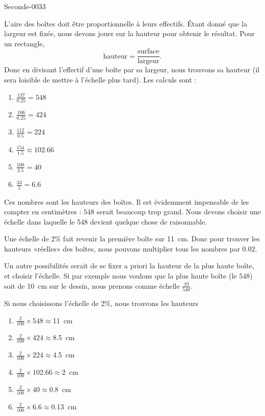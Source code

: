 
\begin{corrige}{Seconde-0033}

    L'aire des boîtes doit être proportionnelle à leurs effectifs. Étant donné que la largeur est fixée, nous devons jouer sur la hauteur pour obtenir le résultat. Pour un rectangle,
    \begin{equation}
        \text{hauteur}=\frac{ \text{surface} }{ \text{largeur} }.
    \end{equation}
    Donc en divisant l'effectif d'une boîte par sa largeur, nous trouvons sa hauteur (il sera loisible de mettre à l'échelle plus tard). Les calculs sont :
    \begin{enumerate}
        \item
            \( \frac{ 137 }{ 0.25 }=548\)
        \item
            \( \frac{ 106 }{ 0.25 }=424\)
        \item
            \( \frac{ 112 }{ 0.5 }=224\)
        \item
            \( \frac{ 154 }{ 1.5 }\approx 102.66\)
        \item
            \( \frac{ 100 }{ 2.5 }=40\)
        \item
            \( \frac{ 33 }{ 5 }=6.6\)
    \end{enumerate}
    Ces nombres sont les hauteurs des boîtes. Il est évidemment impensable de les compter en centimètres : \( 548\) serait beaucoup trop grand. Nous devons choisir une échelle dans laquelle le 548 devient quelque chose de raisonnable.

    Une échelle de \( 2\%\) fait revenir la première boîte sur \SI{11}{\centi\meter}. Donc pour trouver les hauteurs «réelles» des boîtes, nous pouvons multiplier tous les nombres par \( 0.02\).

    Un autre possibilités serait de se fixer a priori la hauteur de la plus haute boîte, et choisir l'échelle. Si par exemple nous voulons que la plus haute boîte (le \( 548\)) soit de \SI{10}{\centi\meter} sur le dessin, nous prenons comme échelle \( \frac{ 10 }{ 548 }\).

    Si nous choisissons l'échelle de \( 2\%\), nous trouvons les hauteurs
    \begin{enumerate}
        \item
            \( \frac{ 2 }{ 100 }\times 548\approx \)\SI{11}{\centi\meter}
        \item
            \( \frac{ 2 }{ 100 }\times 424\approx \)\SI{8.5}{\centi\meter}
        \item
            \( \frac{ 2 }{ 100 }\times 224\approx \)\SI{4.5}{\centi\meter}
        \item
            \( \frac{ 2 }{ 100 }\times 102.66\approx \)\SI{2}{\centi\meter}
        \item
            \( \frac{ 2 }{ 100 }\times 40\approx \)\SI{0.8}{\centi\meter}
        \item
            \( \frac{ 2 }{ 100 }\times 6.6\approx \)\SI{0.13}{\centi\meter}
    \end{enumerate}


\end{corrige}
